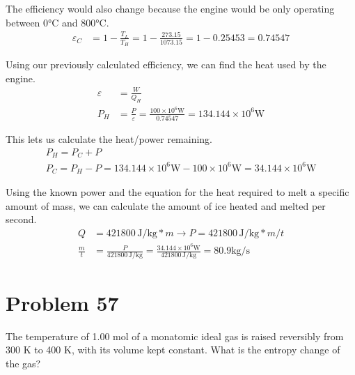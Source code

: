 \documentclass[12pt]{article}
\newcommand{\E}[1]{\times 10^{#1}}
\begin{document}
            The efficiency would also change because the engine would be only operating between 0\unit{\celsius} and 800\unit{\celsius}.
            \begin{align}
                \varepsilon_C   &=  1 - \frac{T_L}{T_H}
                    =   1 - \frac{273.15}{1073.15}
                    =   1 - 0.25453
                    =   0.74547
            \end{align}

            Using our previously calculated efficiency, we can find the heat used by the engine.
            \begin{align}
                \varepsilon &=  \frac{W}{Q_H}\\
                P_H &=  \frac{P}{\varepsilon}
                    =   \frac{100\E{6}\unit{\watt}}{0.74547}
                    =   134.144\E{6}\unit{\watt}
            \end{align}

            This lets us calculate the heat/power remaining.
            \begin{gather}
                P_H =   P_C + P\\
                P_C =   P_H - P
                    =   134.144\E{6}\unit{\watt} - 100\E{6}\unit{\watt}
                    =   34.144\E{6}\unit{\watt}
            \end{gather}

            Using the known power and the equation for the heat required to melt a specific amount of mass, we can calculate the amount of ice heated and melted per second.
            \begin{align}
                Q   &=  421800\,\unit{\joule/\kilo\gram} * m \to 
                P   =   421800\,\unit{\joule/\kilo\gram} * m/t\\
                \frac{m}{t} &=  \frac{P}{421800\,\unit{\joule/\kilo\gram}}
                    =   \frac{34.144\E{6}\unit{\watt}}{421800\,\unit{\joule/\kilo\gram}}
                    =   \boxed{80.9\unit{\kilo\gram/\second}}
            \end{align}

    \pagebreak
    \section{Problem 57}
        The temperature of 1.00 mol of a monatomic ideal gas is raised reversibly from 300 K to 400 K, with its volume kept constant. 
        What is the entropy change of the gas?
\end{document}
